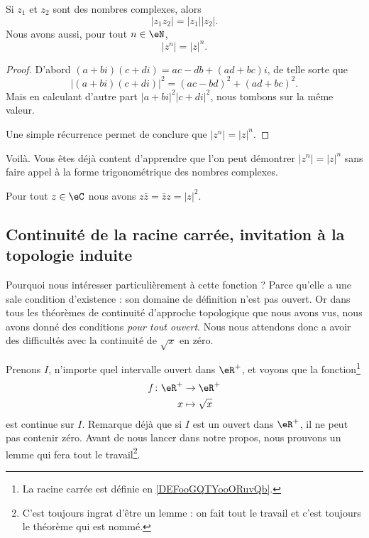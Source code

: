 \begin{proposition} \label{PROPooXLARooYSDCsF}
 Si \( z_1\) et \( z_2\) sont des nombres complexes, alors 
 \begin{equation}
     | z_1z_2 |=| z_1 | |z_2 |.
 \end{equation}
 Nous avons aussi, pour tout \( n\in \eN\),
 \begin{equation}       \label{EQooATTQooRpJeCo}
     | z^n |=| z |^n.
 \end{equation}
\end{proposition}

\begin{proof}
    D'abord \( (a+bi)(c+di)=ac-db+(ad+bc)i\), de telle sorte que
    \begin{equation}
        | (a+bi)(c+di) |^2=(ac-bd)^2+(ad+bc)^2.
    \end{equation}
    Mais en calculant d'autre part \( | a+bi |^2| c+di |^2\), nous tombons sur la même valeur.

    Une simple récurrence permet de conclure que \( | z^n |=| z |^n\).
\end{proof}
Voilà. Vous êtes déjà content d'apprendre que l'on peut démontrer \( | z^n |=| z |^n\) sans faire appel à la forme trigonométrique des nombres complexes.


\begin{lemma}   \label{LEMooONLNooXLNbtB}
    Pour tout \( z\in \eC\) nous avons \( z\bar z=\bar z z=| z |^2\).
\end{lemma}


\subsection{Continuité de la racine carrée, invitation à la topologie induite}

Pourquoi nous intéresser particulièrement à cette fonction ? Parce qu'elle a une sale condition d'existence : son domaine de définition n'est pas ouvert. Or dans tous les théorèmes de continuité d'approche topologique que nous avons vus, nous avons donné des conditions \emph{pour tout ouvert}. Nous nous attendons donc a avoir des difficultés avec la continuité de $\sqrt{x}$ en zéro.

Prenons $I$, n'importe quel intervalle ouvert dans $\eR^+$, et voyons que la fonction\footnote{La racine carrée est définie en \ref{DEFooGQTYooORuvQb}.}
\begin{equation}
\begin{aligned}
 f\colon \eR^+&\to \eR^+ \\
   x&\mapsto \sqrt{x}
\end{aligned}
\end{equation}
est continue sur $I$. Remarque déjà que si $I$ est un ouvert dans $\eR^+$, il ne peut pas contenir zéro. Avant de nous lancer dans notre propos, nous prouvons un lemme qui fera tout le travail\footnote{C'est toujours ingrat d'être un lemme : on fait tout le travail et c'est toujours le théorème qui est nommé.}.

